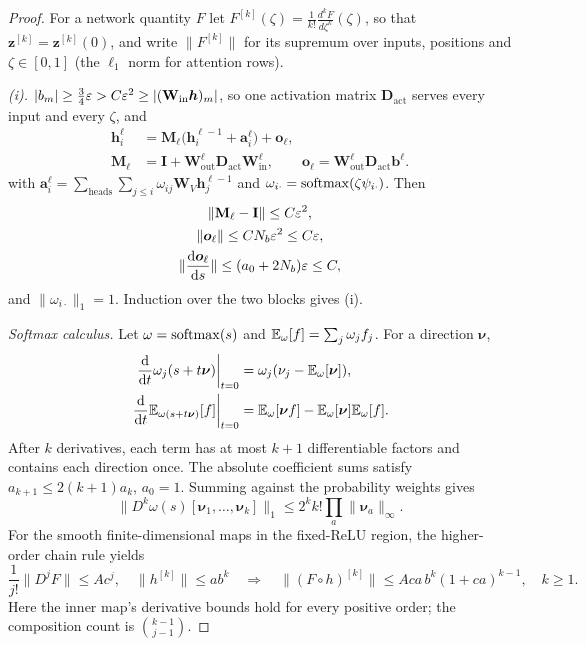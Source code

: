 \begin{proof}
For a network quantity $F$ let $F^{[k]}(\zeta)=\frac{1}{k!}\frac{d^kF}{d\zeta^k}(\zeta)$, so that $\bm z^{[k]}=\bm z^{[k]}(0)$, and write $\|F^{[k]}\|$ for its supremum over
inputs, positions and $\zeta\in[0,1]$ (the $\ell_1$ norm for attention rows).

\emph{(i).} $|b_m|\ge\frac{3}{4}\varepsilon>C\varepsilon^2\ge|(\mathbf W_{\mathrm{in}}\bm h)_m|$, so one activation matrix $\mathbf D_{\mathrm{act}}$ serves every input and every $\zeta$, and
\[
 \begin{aligned}
 \bm h_i^\ell&=\mathbf M_\ell\bigl(\bm h_i^{\ell-1}+\bm a_i^\ell\bigr)+\bm o_\ell,\\
 \mathbf M_\ell&=\mathbf I+\mathbf W^\ell_{\mathrm{out}}\mathbf D_{\mathrm{act}}\mathbf W^\ell_{\mathrm{in}},\qquad
 \bm o_\ell=\mathbf W^\ell_{\mathrm{out}}\mathbf D_{\mathrm{act}}\bm b^\ell.
 \end{aligned}
\]
with $\bm a_i^\ell=\sum_{\mathrm{heads}}\sum_{j\le i}\omega_{ij}\mathbf W_V\bm h^{\ell-1}_j$ and $\omega_{i\cdot}=\operatorname{softmax}(\zeta\psi_{i\cdot})$. Then
 \[
\begin{gathered}
\|\mathbf M_\ell-\mathbf I\|\le C\initscale^2,\\ \|\bm o_\ell\|\le CN_b\initscale^2\le C\initscale,\\ \|\dd{\bm o_\ell}{s}\|\le(a_0+2N_b)\initscale\le C,
\end{gathered}
\] 
and $\|\omega_{i\cdot}\|_1=1$. Induction over the two blocks gives (i).

\emph{Softmax calculus.} Let $\omega=\operatorname{softmax}(s)$ and
$\mathbb E_\omega[f]=\sum_j\omega_jf_j$. For a direction $\bm\nu$,
\begin{align*}
 \left.\dd{}{t}\omega_j(s+t\bm\nu)\right|_{t=0}
 &=\omega_j(\nu_j-\E_\omega[\bm\nu]),\\
 \left.\dd{}{t}\E_{\omega(s+t\bm\nu)}[f]\right|_{t=0}
 &=\E_\omega[\bm\nu f]-\E_\omega[\bm\nu]\E_\omega[f].
\end{align*}
After $k$ derivatives, each term has at most $k+1$ differentiable factors
and contains each direction once. The absolute coefficient sums satisfy
$a_{k+1}\le2(k+1)a_k$, $a_0=1$. Summing against the probability weights gives
\begin{equation}
 \bigl\|D^k\omega(s)[\bm\nu_1,\ldots,\bm\nu_k]\bigr\|_1\le2^kk!\prod_a\|\bm\nu_a\|_\infty .
 \label{eq:softmax-avg}
\end{equation}
For the smooth finite-dimensional maps in the fixed-ReLU region, the
higher-order chain rule \citep[Theorem~2]{clark2013faa} yields
\[
 \frac{1}{j!}\|D^jF\|\le Ac^j,\quad \|h^{[k]}\|\le ab^k
 \quad\Longrightarrow\quad
 \|(F\circ h)^{[k]}\|\le Aca\,b^k(1+ca)^{k-1},\quad k\ge1.
\]
Here the inner map's derivative bounds hold for every positive order; the
composition count is $\binom{k-1}{j-1}$.


\end{proof}
